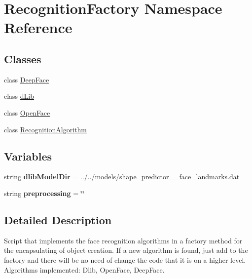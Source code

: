 \hypertarget{namespaceRecognitionFactory}{}\section{Recognition\+Factory Namespace Reference}
\label{namespaceRecognitionFactory}
\subsection*{Classes}
\begin{DoxyCompactItemize}
\item 
class \hyperlink{classRecognitionFactory_1_1DeepFace}{Deep\+Face}
\item 
class \hyperlink{classRecognitionFactory_1_1dLib}{d\+Lib}
\item 
class \hyperlink{classRecognitionFactory_1_1OpenFace}{Open\+Face}
\item 
class \hyperlink{classRecognitionFactory_1_1RecognitionAlgorithm}{Recognition\+Algorithm}
\end{DoxyCompactItemize}
\subsection*{Variables}
\begin{DoxyCompactItemize}
\item 
string {\bfseries dlib\+Model\+Dir} = \textquotesingle{}../../models/shape\+\_\+predictor\+\_\+\_\+face\+\_\+landmarks.\+dat\textquotesingle{}\hypertarget{namespaceRecognitionFactory_ade440dc4b1ebeeb99bbf9123682c441b}{}\label{namespaceRecognitionFactory_ade440dc4b1ebeeb99bbf9123682c441b}

\item 
string {\bfseries preprocessing} = \char`\"{}\char`\"{}\hypertarget{namespaceRecognitionFactory_a99871b79810803045f1def69fb36565a}{}\label{namespaceRecognitionFactory_a99871b79810803045f1def69fb36565a}

\end{DoxyCompactItemize}


\subsection{Detailed Description}
\begin{DoxyVerb}Script that implements the face recognition algorithms in a factory method for the encapsulating of object creation.
If a new algorithm is found, just add to the factory and there will be no need of change the code that it is on a higher level.
Algorithms implemented: Dlib, OpenFace, DeepFace.
\end{DoxyVerb}
 